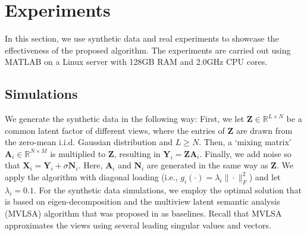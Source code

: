 \documentclass[10pt,journal]{IEEEtran}
\begin{document}
\section{Experiments}

In this section, we use synthetic data and real experiments to showcase the effectiveness of the proposed algorithm.
The experiments are carried out using {MATLAB} on a Linux server with 128GB RAM and 2.0GHz CPU cores.

\subsection{Simulations}
We generate the synthetic data in the following way: First, we let ${\bm Z}\in\mathbb{R}^{L\times N}$ be a common latent factor of different views,
where the entries of ${\bm Z}$ are drawn from the zero-mean i.i.d. Gaussian distribution and $L\geq N$.
Then, a `mixing matrix' ${\bm A}_i\in\mathbb{R}^{N\times M}$ is multiplied to ${\bm Z}$, resulting in ${\bm Y}_i={\bm Z}{\bm A}_i$.
Finally, we add noise so that ${\bm X}_i={\bm Y}_i + \sigma{\bm N}_i$.
Here, ${\bm A}_i$ and ${\bm N}_i$ are generated in the same way as ${\bm Z}$.
We apply the algorithm with diagonal loading (i.e., $g_i(\cdot)=\lambda_i\|\cdot\|_F^2$) and let $\lambda_i=0.1$.
For the synthetic data simulations, we employ the optimal solution that is based on eigen-decomposition
and the multiview latent semantic analysis (MVLSA) algorithm that was proposed in \cite{rastogimultiview} as baselines. 
Recall that MVLSA approximates the views using several leading singular values and vectors.
\end{document}
